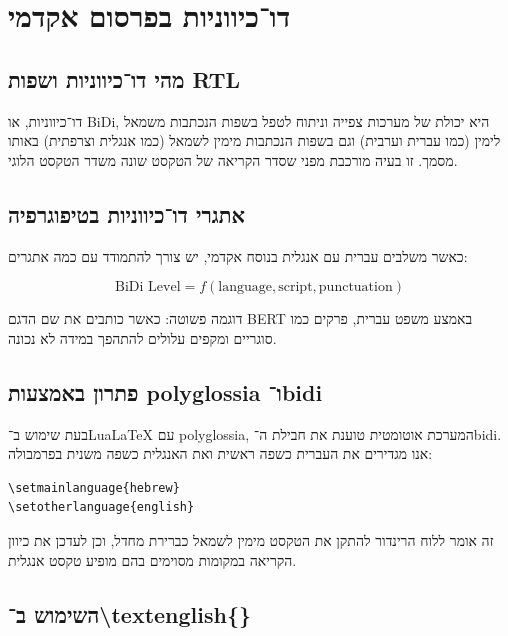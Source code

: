 \chapter{דו־כיווניות בפרסום אקדמי}

\section{מהי דו־כיווניות ושפות \textenglish{RTL}}

דו־כיווניות, או \textenglish{BiDi}, היא יכולת של מערכות צפייה וניתוח לטפל בשפות
הנכתבות משמאל לימין (כמו עברית וערבית) וגם בשפות הנכתבות מימין לשמאל (כמו אנגלית וצרפתית)
באותו מסמך. זו בעיה מורכבת מפני שסדר הקריאה של הטקסט שונה משדר הטקסט הלוגי.

\section{אתגרי דו־כיווניות בטיפוגרפיה}

כאשר משלבים עברית עם אנגלית בנוסח אקדמי, יש צורך להתמודד עם כמה אתגרים:

\begin{equation}
\text{BiDi Level} = f(\text{language}, \text{script}, \text{punctuation})
\end{equation}

דוגמה פשוטה: כאשר כותבים את שם הדגם \textenglish{BERT} באמצע משפט עברית,
פרקים כמו סוגריים ומקפים עלולים להתהפך במידה לא נכונה.

\section{פתרון באמצעות \textenglish{polyglossia} ו־\textenglish{bidi}}

בעת שימוש ב־\textenglish{LuaLaTeX} עם \textenglish{polyglossia}, 
המערכת אוטומטית טוענת את חבילת ה־\textenglish{bidi}.
אנו מגדירים את העברית כשפה ראשית ואת האנגלית כשפה משנית בפרמבולה:

\begin{LTR}
\begin{verbatim}
\setmainlanguage{hebrew}
\setotherlanguage{english}
\end{verbatim}
\end{LTR}

זה אומר ללוח הרינדור להתקן את הטקסט מימין לשמאל כברירת מחדל,
וכן לעדכן את כיוון הקריאה במקומות מסוימים בהם מופיע טקסט אנגלית.

\section{השימוש ב־\textenglish{\textbackslash textenglish\{\}}}

